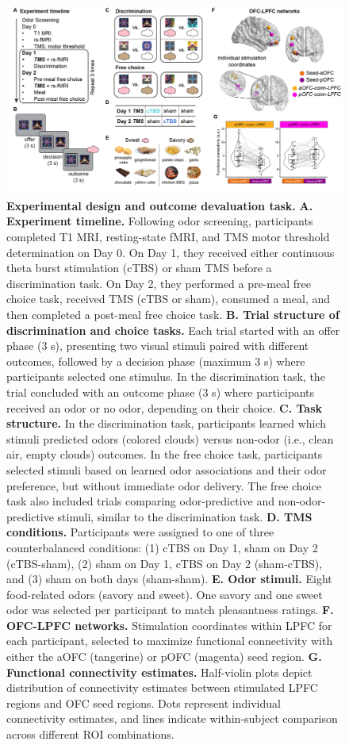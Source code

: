 \documentclass[lineno,sn-basic]{sn-jnl}%
\begin{document}
\begin{figure}
\centering
\includegraphics[width=\linewidth]{Fig_design.png}
\caption{\textbf{Experimental design and outcome devaluation task.} \textbf{A. Experiment timeline.} Following odor screening, participants completed T1 MRI, resting-state fMRI, and TMS motor threshold determination on Day 0. On Day 1, they received either continuous theta burst stimulation (cTBS) or sham TMS before a discrimination task. On Day 2, they performed a pre-meal free choice task, received TMS (cTBS or sham), consumed a meal, and then completed a post-meal free choice task. \textbf{B. Trial structure of discrimination and choice tasks.} Each trial started with an offer phase (3 s), presenting two visual stimuli paired with different outcomes, followed by a decision phase (maximum 3 s) where participants selected one stimulus. In the discrimination task, the trial concluded with an outcome phase (3 s) where participants received an odor or no odor, depending on their choice.
\textbf{C. Task structure.} In the discrimination task, participants learned which stimuli predicted odors (colored clouds) versus non-odor (i.e., clean air, empty clouds) outcomes. In the free choice task, participants selected stimuli based on learned odor associations and their odor preference, but without immediate odor delivery. The free choice task also included trials comparing odor-predictive and non-odor-predictive stimuli, similar to the discrimination task. 
\textbf{D. TMS conditions.} Participants were assigned to one of three counterbalanced conditions: (1) cTBS on Day 1, sham on Day 2 (cTBS-sham), (2) sham on Day 1, cTBS on Day 2 (sham-cTBS), and (3) sham on both days (sham-sham). 
\textbf{E. Odor stimuli.} Eight food-related odors (savory and sweet). One savory and one sweet odor was selected per participant to match pleasantness ratings. 
\textbf{F. OFC-LPFC networks.} Stimulation coordinates within LPFC for each participant, selected to maximize functional connectivity with either the aOFC (tangerine) or pOFC (magenta) seed region. 
\textbf{G. Functional connectivity estimates.} Half-violin plots depict distribution of connectivity estimates between stimulated LPFC regions and OFC seed regions. Dots represent individual connectivity estimates, and lines indicate within-subject comparison across different ROI combinations.}
\label{fig-design}
\end{figure}
\end{document}
